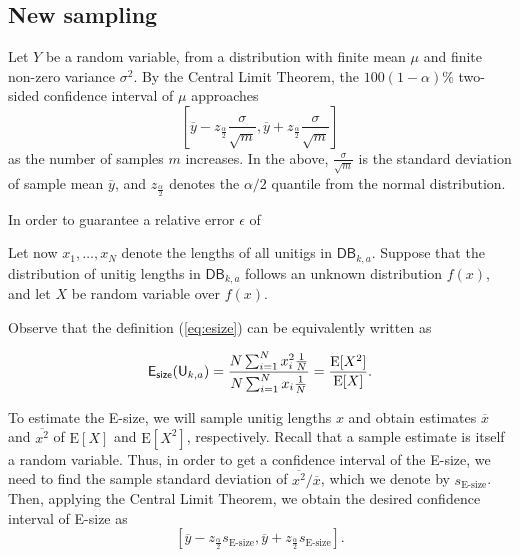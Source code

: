 \documentclass[a4paper,11pt]{article}
\newcommand{\DB}{\mathsf{DB}_{k,a}}
\newcommand{\U}{\mathsf{U}_{k,a}}
\newcommand{\esize}{{\sf E_{size}}}
\newcommand{\E}{\text{E}}
\begin{document}







\subsection{New sampling}

Let $Y$ be a random variable, from a distribution with finite mean $\mu$ and finite non-zero variance $\sigma^2$. By the Central Limit Theorem, the $100(1-\alpha)\%$ two-sided confidence interval of $\mu$ approaches 
\[\left[\overline{y} - z_{\frac{\alpha}{2}}\frac{\sigma}{\sqrt{m}} , \overline{y} + z_{\frac{\alpha}{2}}\frac{\sigma}{\sqrt{m}}\right] \]
as the number of samples $m$ increases. In the above, $\frac{\sigma}{\sqrt{m}}$ is the standard deviation of sample mean $\overline{y}$, and $z_{\frac{\alpha}{2}}$ denotes the $\alpha/2$ quantile from the normal distribution.

In order to guarantee a relative error $\epsilon$ of 

Let now $x_1,\dots,x_N$ denote the lengths of all unitigs in $\DB$. Suppose that the distribution of unitig lengths in $\DB$ follows an unknown distribution $f(x)$, and let $X$ be random variable over $f(x)$.

Observe that the definition (\ref{eq:esize}) can be equivalently written as 

\[\esize(\U) = \frac{N \sum_{i = 1}^{N} x_i^2\frac{1}{N}}{N\sum_{i = 1}^{N} x_i\frac{1}{N}} = \frac{\E[X^2]}{\E[X]}.\]

To estimate the E-size, we will sample unitig lengths $x$ and obtain estimates $\overline{x}$ and $\overline{x^2}$ of $\E[X]$ and $\E[X^2]$, respectively. Recall that a sample estimate is itself a random variable. Thus, in order to get a confidence interval of the E-size, we need to find the sample standard deviation of $\overline{x^2}/\overline{x}$, which we denote by $s_{\text{E-size}}$. Then, applying the Central Limit Theorem, we obtain the desired confidence interval of E-size as 
\[\left[\overline{y} - z_{\frac{\alpha}{2}}s_{\text{E-size}} , \overline{y} + z_{\frac{\alpha}{2}}s_{\text{E-size}}\right]. \]
\end{document}
